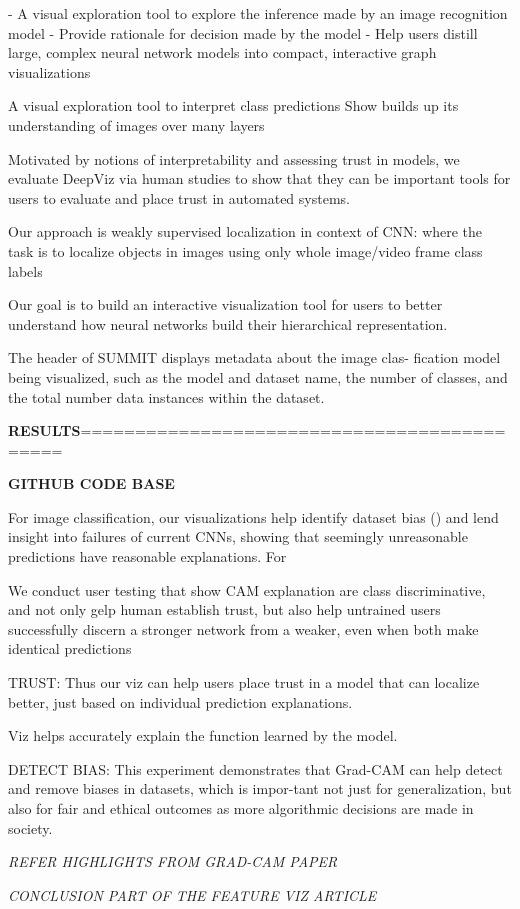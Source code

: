- A visual exploration tool to explore the inference made by an image recognition model
- Provide rationale for decision made by the model
- Help users distill large, complex neural network models into compact, interactive graph visualizations

A visual exploration tool to interpret class predictions
Show builds up its understanding of images over many layers

Motivated by notions of interpretability and assessing trust in models, we evaluate DeepViz via human studies to show that they can be important tools for users to evaluate and place trust in automated systems.

Our approach is weakly supervised localization in context of CNN: where the task is to localize objects in images using only whole image/video frame class labels

Our goal is to build an interactive visualization tool for users to better
understand how neural networks build their hierarchical representation.


  The header of SUMMIT displays metadata about the image clas-
fication model being visualized, such as the model and dataset name, the number of classes, and the total number data instances within the dataset.

\textbf{RESULTS}============================================

\textbf{GITHUB CODE BASE}

For image classification, our visualizations help identify dataset bias () and lend insight into failures of current CNNs, showing that seemingly unreasonable predictions have reasonable explanations. For

We conduct user testing that show CAM explanation are class discriminative, and not only gelp  human establish trust, but also help untrained users successfully discern a stronger network from a weaker, even when both make identical predictions

TRUST: Thus our viz can help users place trust in a model that can localize better, just based on individual prediction explanations.

Viz helps accurately explain the function learned by the model.

DETECT BIAS: This experiment demonstrates that Grad-CAM can
help detect and remove biases in datasets, which is impor-tant not just for generalization, but also for fair and ethical
outcomes as more algorithmic decisions are made in society.

\textit{REFER HIGHLIGHTS FROM GRAD-CAM PAPER}

\textit{CONCLUSION PART OF THE FEATURE VIZ ARTICLE}




